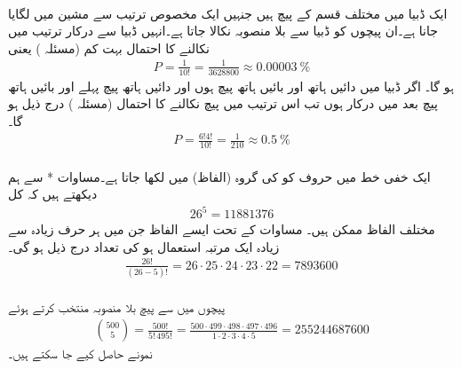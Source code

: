 \quad {}\\
ایک ڈبیا میں  مختلف قسم کے پیچ ہیں جنہیں ایک مخصوص ترتیب سے مشین میں لگایا جانا ہے۔ان پیچوں کو ڈبیا سے بلا منصوبہ نکالا جاتا ہے۔انہیں ڈبیا سے درکار ترتیب میں نکالنے کا احتمال  بہت کم  (مسئلہ ) یعنی
\begin{align*}
P=\frac{1}{10!}=\frac{1}{\num{3628800}}\approx \SI{0.00003}{\percent}
\end{align*}
ہو گا۔ اگر ڈبیا میں  دائیں ہاتھ اور  بائیں ہاتھ پیچ ہوں اور  دائیں ہاتھ پیچ پہلے اور  بائیں ہاتھ پیچ بعد میں درکار ہوں تب اس ترتیب میں پیچ نکالنے کا احتمال  (مسئلہ ) درج ذیل ہو گا۔
\begin{align*}
P=\frac{6!4!}{10!}=\frac{1}{210}\approx \SI{0.5}{\percent}
\end{align*}
\quad {}\\
ایک خفی خط میں حروف کو  کی گروہ (الفاظ) میں لکھا جاتا ہے۔مساوات * سے ہم دیکھتے ہیں کہ کل
\begin{align*}
26^5=\num{11881376}
\end{align*}
مختلف الفاظ ممکن ہیں۔ مساوات  کے تحت ایسے الفاظ جن میں ہر حرف زیادہ سے زیادہ  ایک مرتبہ استعمال ہو کی تعداد درج ذیل ہو گی۔
\begin{align*}
\frac{26!}{(26-5)!}=26\cdot 25\cdot 24\cdot 23\cdot 22=\num{7893600}
\end{align*}
\quad {}\\
 پیچوں میں سے  پیچ بلا منصوبہ منتخب کرتے ہوئے
\begin{align*}
\binom{500}{5}=\frac{500!}{5!\,495!}=\frac{500\cdot 499\cdot 498\cdot 497\cdot 496}{1\cdot 2\cdot 3\cdot 4\cdot 5}=\num{255244687600}
\end{align*}
نمونے حاصل کیے جا سکتے ہیں۔ 


